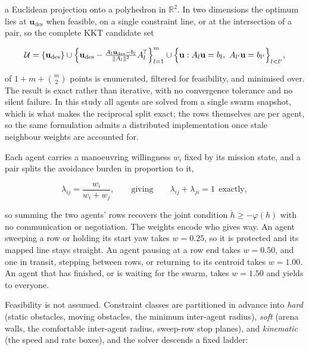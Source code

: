 \documentclass[10pt,letterpaper]{article}
\begin{document}
a Euclidean projection onto a polyhedron in $\mathbb{R}^2$. In two dimensions the optimum
lies at $\mathbf{u}_{\mathrm{des}}$ when feasible, on a single constraint line, or at the
intersection of a pair, so the complete KKT candidate set

\begin{equation}
    \label{eq:e22}
    \mathcal{U}=\{\mathbf{u}_{\mathrm{des}}\}\cup
    \Bigl\{\mathbf{u}_{\mathrm{des}}-\tfrac{A_l\mathbf{u}_{\mathrm{des}}-b_l}{\|A_l\|^2}A_l^{\!\top}\Bigr\}_{l=1}^{m}
    \cup\Bigl\{\mathbf{u}: A_l\mathbf{u}=b_l,\ A_{l'}\mathbf{u}=b_{l'}\Bigr\}_{l<l'},
\end{equation}

of $1+m+\binom{m}{2}$ points is enumerated, filtered for feasibility, and minimised over.
The result is exact rather than iterative, with no convergence tolerance and no silent
failure. In this study all agents are solved from a single swarm snapshot, which is what makes the
reciprocal split exact; the rows themselves are per agent, so the same formulation admits a
distributed implementation once stale neighbour weights are accounted for.

Each agent carries a manoeuvring willingness $w_i$ fixed by its mission state, and a pair
splits the avoidance burden in proportion to it,

\begin{equation}
    \lambda_{ij}=\frac{w_i}{w_i+w_j},
    \qquad\text{giving}\qquad
    \lambda_{ij}+\lambda_{ji}=1\ \ \text{exactly},
    \label{eq:lambda}
\end{equation}

so summing the two agents' rows recovers the joint condition $\dot h\ge-\varphi(h)$ with no
communication or negotiation. The weights encode who gives way. An agent sweeping a row or holding its
start yaw takes $w=0.25$, so it is protected and its mapped line stays straight. An agent
pausing at a row end takes $w=0.50$, and one in transit, stepping between rows, or
returning to its centroid takes $w=1.00$. An agent that has finished, or is waiting for the
swarm, takes $w=1.50$ and yields to everyone.

Feasibility is not assumed. Constraint classes are partitioned in advance into \emph{hard}
(static obstacles, moving obstacles, the minimum inter-agent radius), \emph{soft} (arena
walls, the comfortable inter-agent radius, sweep-row stop planes), and \emph{kinematic} (the
speed and rate boxes), and the solver descends a fixed ladder:
\end{document}
